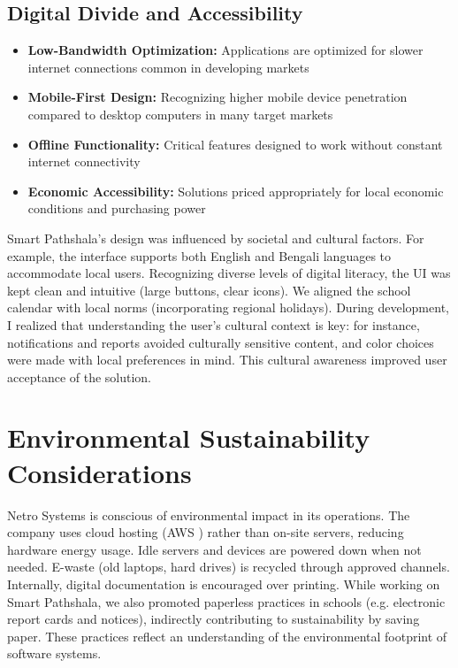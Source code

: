 \documentclass[12pt,a4paper]{report}
\newcommand{\skill}[1]{\textcolor{skillcolor}{\textbf{#1}}}
\let\oldcite\cite
\renewcommand{\cite}[1]{\textcolor{impactcolor}{\oldcite{#1}}}
\newenvironment{coloritemize}
{\begin{itemize}[label=\textcolor{primaryblue}{$\bullet$}]}
{\end{itemize}}
\begin{document}
\subsection{Digital Divide and Accessibility}
\begin{coloritemize}
    \item \skill{Low-Bandwidth Optimization:} Applications are optimized for slower internet connections common in developing markets
    \item \skill{Mobile-First Design:} Recognizing higher mobile device penetration compared to desktop computers in many target markets
    \item \skill{Offline Functionality:} Critical features designed to work without constant internet connectivity
    \item \skill{Economic Accessibility:} Solutions priced appropriately for local economic conditions and purchasing power
\end{coloritemize}
Smart Pathshala’s design was influenced by societal and cultural factors. For example, the interface supports both English and Bengali languages to accommodate local users. Recognizing diverse levels of digital literacy, the UI was kept clean and intuitive (large buttons, clear icons). We aligned the school calendar with local norms (incorporating regional holidays). During development, I realized that understanding the user’s cultural context is key: for instance, notifications and reports avoided culturally sensitive content, and color choices were made with local preferences in mind. This cultural awareness improved user acceptance of the solution.

\section{Environmental Sustainability Considerations}
Netro Systems is conscious of environmental impact in its operations. The company uses cloud hosting (AWS \cite{ref7}) rather than on-site servers, reducing hardware energy usage. Idle servers and devices are powered down when not needed. E-waste (old laptops, hard drives) is recycled through approved channels. Internally, digital documentation is encouraged over printing. While working on Smart Pathshala, we also promoted paperless practices in schools (e.g. electronic report cards and notices), indirectly contributing to sustainability by saving paper. These practices reflect an understanding of the environmental footprint of software systems.
\end{document}
